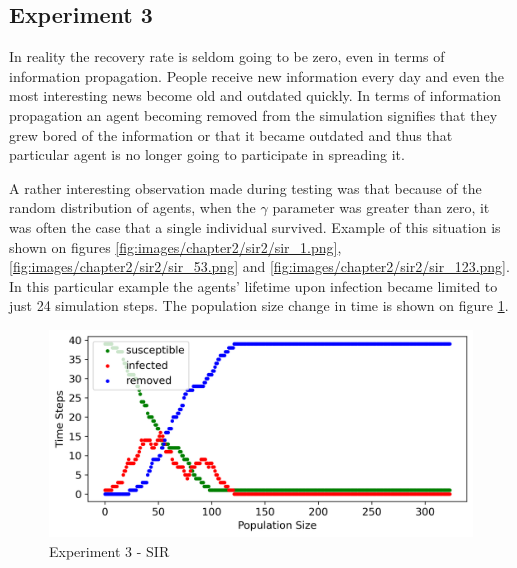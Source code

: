 \subsection{Experiment 3}

In reality the recovery rate is seldom going to be zero, even in terms of information propagation.
People receive new information every day and even the most interesting news become old and outdated quickly.
In terms of information propagation an agent becoming removed from the simulation signifies that they grew bored of the information or that it became outdated and thus that particular agent is no longer going to participate in spreading it.


A rather interesting observation made during testing was that because of the random distribution of agents, when the $\gamma$ parameter was greater than zero, it was often the case that a single individual survived.
Example of this situation is shown on figures \ref{fig:images/chapter2/sir2/sir_1.png}, \ref{fig:images/chapter2/sir2/sir_53.png} and \ref{fig:images/chapter2/sir2/sir_123.png}.
In this particular example the agents' lifetime upon infection became limited to just 24 simulation steps.
The population size change in time is shown on figure \ref{fig:images/chapter2/sir2/sir.png}.

\begin{figure}[H]
    \centering
    \includegraphics[width=1.0\textwidth]{images/chapter2/sir2/sir.png}
    \caption{Experiment 3 - SIR}\label{fig:images/chapter2/sir2/sir.png}
\end{figure}

